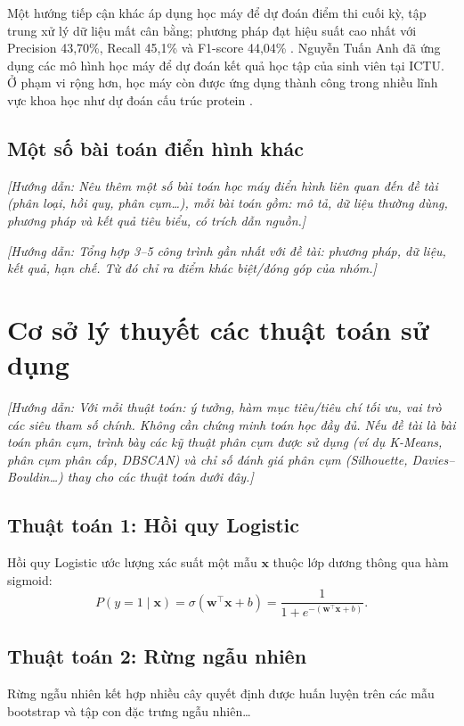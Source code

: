 \documentclass[12pt,a4paper,oneside]{report}
\newcommand{\huongdan}[1]{{\color{guide}\itshape [Hướng dẫn: #1]}}
\begin{document}
Một hướng tiếp cận khác áp dụng học máy để dự đoán điểm thi cuối kỳ, tập
trung xử lý dữ liệu mất cân bằng; phương pháp đạt hiệu suất cao nhất với
Precision 43,70\%, Recall 45,1\% và F1-score 44,04\%
\cite{lananh,hai2017,thuan2022,thuy2023}. Nguyễn Tuấn Anh
\cite{tuananh2024} đã ứng dụng các mô hình học máy để dự đoán kết quả học
tập của sinh viên tại ICTU. Ở phạm vi rộng hơn, học máy còn được ứng dụng
thành công trong nhiều lĩnh vực khoa học như dự đoán cấu trúc protein
\cite{alquraishi2021}.

\subsection{Một số bài toán điển hình khác}
\huongdan{Nêu thêm một số bài toán học máy điển hình liên quan đến đề tài
(phân loại, hồi quy, phân cụm\dots), mỗi bài toán gồm: mô tả, dữ liệu thường
dùng, phương pháp và kết quả tiêu biểu, có trích dẫn nguồn.}

\huongdan{Tổng hợp 3--5 công trình gần nhất với đề tài: phương pháp, dữ liệu,
kết quả, hạn chế. Từ đó chỉ ra điểm khác biệt/đóng góp của nhóm.}

\section{Cơ sở lý thuyết các thuật toán sử dụng}
\huongdan{Với mỗi thuật toán: ý tưởng, hàm mục tiêu/tiêu chí tối ưu, vai trò
các siêu tham số chính. Không cần chứng minh toán học đầy đủ. Nếu đề tài
là bài toán phân cụm, trình bày các kỹ thuật phân cụm được sử dụng (ví dụ
K-Means, phân cụm phân cấp, DBSCAN) và chỉ số đánh giá phân cụm
(Silhouette, Davies--Bouldin\dots) thay cho các thuật toán dưới đây.}

\subsection{Thuật toán 1: Hồi quy Logistic}
Hồi quy Logistic ước lượng xác suất một mẫu $\mathbf{x}$ thuộc lớp dương
thông qua hàm sigmoid:
\begin{equation}
  P(y=1 \mid \mathbf{x}) = \sigma(\mathbf{w}^{\top}\mathbf{x}+b)
  = \frac{1}{1+e^{-(\mathbf{w}^{\top}\mathbf{x}+b)}}.
  \label{eq:sigmoid}
\end{equation}

\subsection{Thuật toán 2: Rừng ngẫu nhiên}
Rừng ngẫu nhiên \cite{breiman2001} kết hợp nhiều cây quyết định được huấn
luyện trên các mẫu bootstrap và tập con đặc trưng ngẫu nhiên\dots
\end{document}
